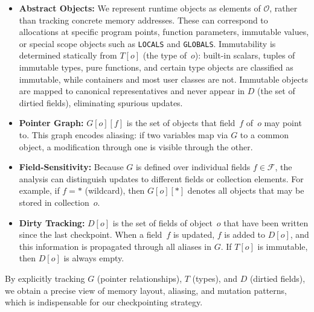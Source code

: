 \begin{itemize}
    \item \textbf{Abstract Objects:}
    We represent runtime objects as elements of $\mathcal{O}$, rather than tracking
    concrete memory addresses. These can correspond to allocations at specific program
    points, function parameters, immutable values, or special scope objects such as
    \texttt{LOCALS} and \texttt{GLOBALS}.  
    Immutability is determined statically from $T[o]$ (the type of~$o$): 
    built-in scalars, tuples of immutable types, pure functions, and certain type objects
    are classified as immutable, while containers and most user classes are not.
    Immutable objects are mapped to canonical representatives and never appear in $D$
    (the set of dirtied fields), eliminating spurious updates.

    \item \textbf{Pointer Graph:}
    $G[o][f]$ is the set of objects that field~$f$ of~$o$ may point to.
    This graph encodes aliasing: if two variables map via $G$ to a common object,
    a modification through one is visible through the other.

    \item \textbf{Field-Sensitivity:}
    Because $G$ is defined over individual fields $f \in \mathcal{F}$, 
    the analysis can distinguish updates to different fields or collection elements.
    For example, if $f = \texttt{*}$ (wildcard), then $G[o][\texttt{*}]$ denotes
    all objects that may be stored in collection~$o$.

    \item \textbf{Dirty Tracking:}
    $D[o]$ is the set of fields of object~$o$ that have been written since the last
    checkpoint. When a field~$f$ is updated, $f$ is added to $D[o]$, and this information
    is propagated through all aliases in $G$.
    If $T[o]$ is immutable, then $D[o]$ is always empty.
\end{itemize}

By explicitly tracking $G$ (pointer relationships), $T$ (types), and $D$ (dirtied fields),
we obtain a precise view of memory layout, aliasing, and mutation patterns,
which is indispensable for our checkpointing strategy.

